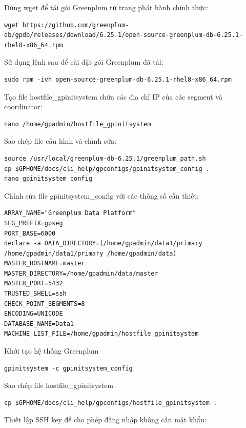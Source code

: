 \documentclass[14pt]{article}
\begin{document}
Dùng wget để tải gói Greenplum từ trang phát hành chính thức:

\begin{verbatim}
wget https://github.com/greenplum-db/gpdb/releases/download/6.25.1/open-source-greenplum-db-6.25.1-rhel8-x86_64.rpm
\end{verbatim}

Sử dụng lệnh sau để cài đặt gói Greenplum đã tải:

\begin{verbatim}
sudo rpm -ivh open-source-greenplum-db-6.25.1-rhel8-x86_64.rpm
\end{verbatim}

Tạo file hostfile\_gpinitsystem chứa các địa chỉ IP của các segment và coordinator:

\begin{verbatim}
nano /home/gpadmin/hostfile_gpinitsystem
\end{verbatim}

Sao chép file cấu hình và chỉnh sửa:

\begin{verbatim}
source /usr/local/greenplum-db-6.25.1/greenplum_path.sh
cp $GPHOME/docs/cli_help/gpconfigs/gpinitsystem_config .
nano gpinitsystem_config
\end{verbatim}

Chỉnh sửa file gpinitsystem\_config với các thông số cần thiết:

\begin{verbatim}
ARRAY_NAME="Greenplum Data Platform"
SEG_PREFIX=gpseg
PORT_BASE=6000
declare -a DATA_DIRECTORY=(/home/gpadmin/data1/primary /home/gpadmin/data1/primary /home/gpadmin/data)
MASTER_HOSTNAME=master
MASTER_DIRECTORY=/home/gpadmin/data/master
MASTER_PORT=5432
TRUSTED_SHELL=ssh
CHECK_POINT_SEGMENTS=8
ENCODING=UNICODE
DATABASE_NAME=Data1
MACHINE_LIST_FILE=/home/gpadmin/hostfile_gpinitsystem
\end{verbatim}

Khởi tạo hệ thống Greenplum

\begin{verbatim}
gpinitsystem -c gpinitsystem_config
\end{verbatim}

Sao chép file hostfile\_gpinitsystem

\begin{verbatim}
cp $GPHOME/docs/cli_help/gpconfigs/hostfile_gpinitsystem .
\end{verbatim}

Thiết lập SSH key để cho phép đăng nhập không cần mật khẩu:
\end{document}
